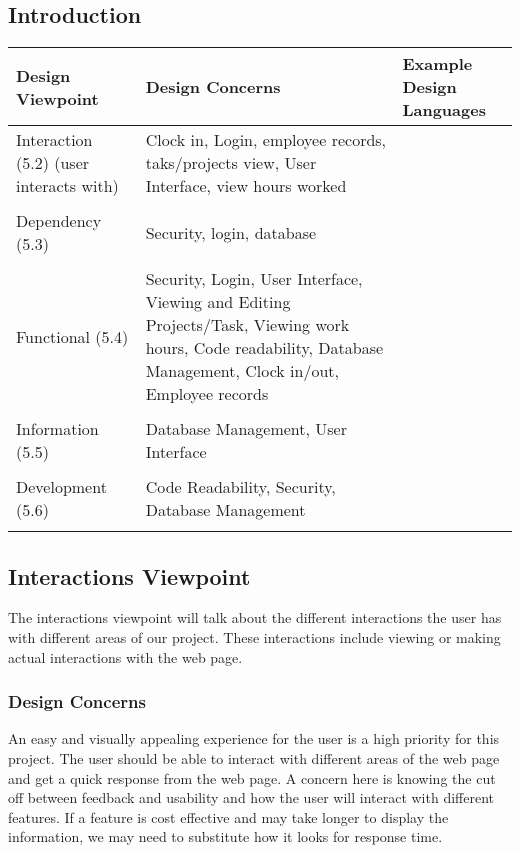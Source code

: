 \documentclass[letterpaper,10pt,titlepage,journal,compsoc,draftclsnofoot,onecolumn]{IEEEtran}
\newcommand\tab[1][1cm]{\hspace*{#1}}
\begin{document}
\subsection{Introduction}

\begin{tabular}{ | l | l | l | }
\hline
	Design Viewpoint & Design Concerns & Example Design Languages \\ \hline
	Interaction (5.2) (user interacts with) & Clock in, Login, employee records, taks/projects view, User Interface, view hours worked &  \\ \hline
	 &  &  \\ \hline
	Dependency (5.3)  & Security, login, database &  \\ \hline
	 &  &  \\ \hline
	Functional (5.4) & Security, Login, User Interface, Viewing and Editing Projects/Task, Viewing work hours, Code readability, Database Management, Clock in/out, Employee records &  \\ \hline
	 &  &  \\ \hline
	Information (5.5) & Database Management, User Interface &  \\ \hline
	 &  &  \\ \hline
	Development (5.6) & Code Readability, Security, Database Management &  \\ \hline
	 &  &  \\ \hline
\end{tabular}

\subsection{Interactions Viewpoint}

\tab The interactions viewpoint will talk about the different interactions the user has with different areas of our project. These interactions include viewing or making actual interactions with the web page.

\subsubsection{Design Concerns}

\tab An easy and visually appealing experience for the user is a high priority for this project. The user should be able to interact with different areas of the web page and get a quick response from the web page. A concern here is knowing the cut off between feedback and usability and how the user will interact with different features. If a feature is cost effective and may take longer to display the information, we may need to substitute how it looks for response time.
\end{document}
